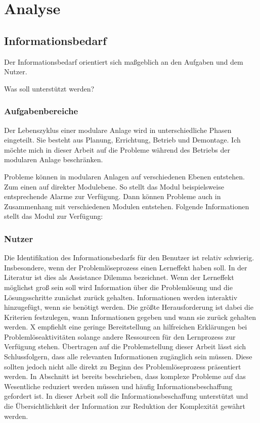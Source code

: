 
\chapter{Analyse}
\label{sec:Anforderungsanalyse}

\section{Informationsbedarf}
Der Informationsbedarf orientiert sich maßgeblich an den Aufgaben und dem Nutzer.

Was soll unterstützt werden?

\subsection{Aufgabenbereiche}
Der Lebenszyklus einer modulare Anlage wird in unterschiedliche Phasen eingeteilt. Sie besteht aus Planung, Errichtung, Betrieb und Demontage. \cite{} Ich möchte mich in dieser Arbeit auf die Probleme während des Betriebs der modularen Anlage beschränken.

Probleme können in modularen Anlagen auf verschiedenen Ebenen entstehen. Zum einen auf direkter Modulebene. So stellt das Modul beispielsweise entsprechende Alarme zur Verfügung. Dann können Probleme auch in Zusammenhang mit verschiedenen Modulen entstehen. Folgende Informationen stellt das Modul zur Verfügung:

\subsection{Nutzer}
Die Identifikation des Informationsbedarfs für den Benutzer ist relativ schwierig. Insbesondere, wenn der Problemlöseprozess einen Lerneffekt haben soll. In der Literatur ist dies als Assistance Dilemma bezeichnet. Wenn der Lerneffekt möglichst groß sein soll wird Information über die Problemlösung und die Lösungsschritte zunächst zurück gehalten. Informationen werden interaktiv hinzugefügt, wenn sie benötigt werden. Die größte Herausforderung ist dabei die Kriterien festzulegen, wann Informationen gegeben und wann sie zurück gehalten werden. \cite{}  X empfiehlt eine geringe Bereitstellung an hilfreichen Erklärungen bei Problemlöseaktivitäten solange andere Ressourcen für den Lernprozess zur Verfügung stehen. Übertragen auf die Problemstellung dieser Arbeit lässt sich Schlussfolgern, dass alle relevanten Informationen zugänglich sein müssen. Diese sollten jedoch nicht alle direkt zu Beginn des Problemlöseprozess präsentiert werden. In Abschnitt ist bereits beschrieben, dass komplexe Probleme auf das Wesentliche reduziert werden müssen und häufig Informationsbeschaffung gefordert ist. In dieser Arbeit soll die Informationsbeschaffung unterstützt und die Übersichtlichkeit der Information zur Reduktion der Komplexität gewährt werden.

